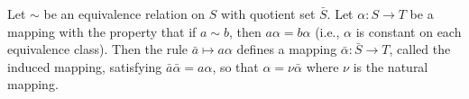 Let $\sim$ be an equivalence relation on $S$ with quotient set $\bar{S}$. Let $\alpha : S \to T$ be a mapping with the property that if $a \sim b$, then $a\alpha = b\alpha$ (i.e., $\alpha$ is constant on each equivalence class). Then the rule $\bar{a} \mapsto a\alpha$ defines a mapping $\bar{\alpha} : \bar{S} \to T$, called the induced mapping, satisfying $\bar{a}\bar{\alpha} = a\alpha$, so that $\alpha = \nu \bar{\alpha}$ where $\nu$ is the natural mapping.

